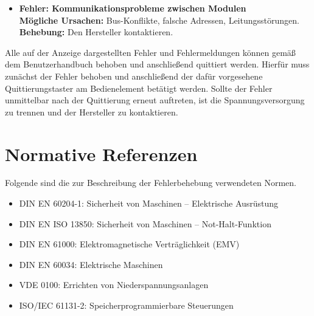 \begin{itemize}
	\item \textbf{Fehler: \glqq Kommunikationsprobleme zwischen Modulen\grqq} \\
	\textbf{Mögliche Ursachen:} Bus-Konflikte, falsche Adressen, Leitungsstörungen. \\
	\textbf{Behebung:} Den Hersteller kontaktieren.  
	
\end{itemize}
Alle auf der Anzeige dargestellten Fehler und Fehlermeldungen können gemäß dem Benutzerhandbuch behoben und anschließend quittiert werden. Hierfür muss zunächst der Fehler behoben und anschließend der dafür vorgesehene Quittierungstaster am Bedienelement betätigt werden. Sollte der Fehler unmittelbar nach der Quittierung erneut auftreten, ist die Spannungsversorgung zu trennen und der Hersteller zu kontaktieren.
\section*{Normative Referenzen}
Folgende sind die zur Beschreibung der Fehlerbehebung verwendeten Normen.
\begin{itemize}
	\item DIN EN 60204-1: Sicherheit von Maschinen – Elektrische Ausrüstung
	\item DIN EN ISO 13850: Sicherheit von Maschinen – Not-Halt-Funktion
	\item DIN EN 61000: Elektromagnetische Verträglichkeit (EMV)
	\item DIN EN 60034: Elektrische Maschinen
	\item VDE 0100: Errichten von Niederspannungsanlagen
	\item ISO/IEC 61131-2: Speicherprogrammierbare Steuerungen
\end{itemize}







